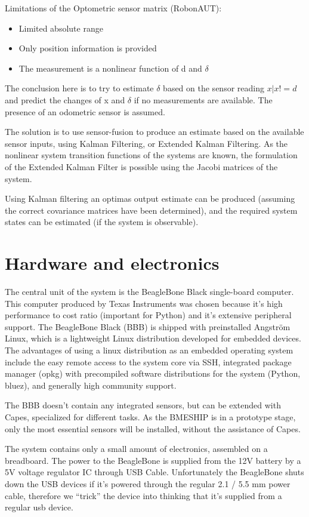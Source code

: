 Limitations of the Optometric sensor matrix (RobonAUT):
\begin{itemize}
\item Limited absolute range
\item Only position information is provided
\item The measurement is a nonlinear function of d and $\delta$
\end{itemize}

The conclusion here is to try to estimate $\delta$ based on the sensor reading $x | x!=d$ and predict the changes of x and $\delta$ if no measurements are available. The presence of an odometric sensor is assumed.

The solution is to use sensor-fusion to produce an estimate based on the available sensor inputs, using Kalman Filtering, or Extended Kalman Filtering.
As the nonlinear system transition functions of the systems are known, the formulation of the Extended Kalman Filter is possible using the Jacobi matrices of the system.

Using Kalman filtering an optimas output estimate can be produced (assuming the correct covariance matrices have been determined), and the required system states can be estimated (if the system is observable).

\section{Hardware and electronics}

The central unit of the system is the BeagleBone Black single-board computer. This computer produced by Texas Instruments was chosen because it's high performance to cost ratio (important for Python) and it's extensive peripheral support.
The BeagleBone Black (BBB) is shipped with preinstalled Angström Linux, which is a lightweight Linux distribution developed for embedded devices. The advantages of using a linux distribution as an embedded operating system include the easy remote access to the system core via SSH, integrated package manager (opkg) with precompiled software distributions for the system (Python, bluez), and generally high community support.

The BBB doesn't contain any integrated sensors, but can be extended with Capes, specialized for different tasks. As the BMESHIP is in a prototype stage, only the most essential sensors will be installed, without the assistance of Capes.

The system contains only a small amount of electronics, assembled on a breadboard. The power to the BeagleBone is supplied from the 12V battery by a 5V voltage regulator IC through USB Cable.
Unfortunately the BeagleBone shuts down the USB devices if it’s powered through the regular 2.1 / 5.5 mm power cable, therefore we “trick” the device into thinking that it’s supplied from a regular usb device.

